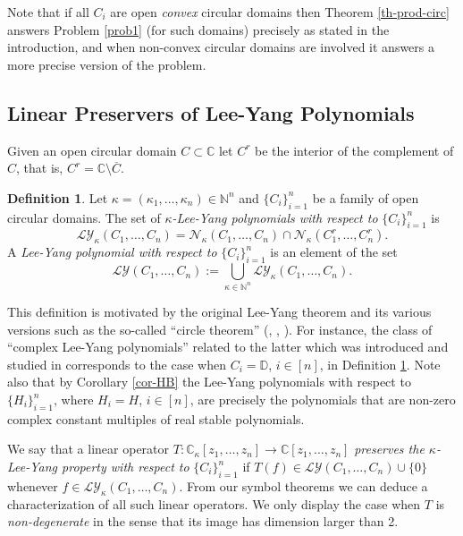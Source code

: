 \documentclass[10pt,reqno]{amsart}
\theoremstyle{plain}
\theoremstyle{definition}
\newtheorem{definition}{Definition}[section]
\theoremstyle{remark}
\numberwithin{equation}{section}
\newcommand{\NN}{\mathbb{N}}
\newcommand{\NV}{\mathcal{N}}
\newcommand{\LY}{\mathcal{LY}}
\newcommand{\CC}{\mathbb{C}}
\newcommand{\DD}{\mathbb{D}}
\begin{document}
Note that if all $C_i$ are open {\em convex} circular domains then  
Theorem \ref{th-prod-circ} answers Problem \ref{prob1} (for such domains) 
precisely as stated in the introduction, and when non-convex circular
 domains are involved 
it answers a more precise version of the problem. 


\subsection{Linear Preservers of Lee-Yang Polynomials}\label{s-LY} 
Given an open circular domain $C\subset \CC$ let $C^r$ be the interior 
of the complement of 
$C$, that is, $C^r=\CC\setminus \overline{C}$. 

\begin{definition}\label{d-ly}
Let $\kappa=(\kappa_1,\ldots,\kappa_n)\in\NN^n$ and  
$\{C_i\}_{i=1}^n$ be a family of open circular domains. The set of 
{\em $\kappa$-Lee-Yang polynomials with respect to} 
$\{C_i\}_{i=1}^{n}$ is 
$$
\LY_\kappa(C_1,\ldots,C_n)=\NV_\kappa(C_1,\ldots,C_n)\cap 
\NV_\kappa(C_1^r,\ldots,C_n^r).
$$ 
A {\em Lee-Yang polynomial  
with respect to} $\{C_i\}_{i=1}^{n}$ is an element of the set
$$
\LY(C_1,\ldots,C_n):=\bigcup_{\kappa\in\NN^n}
\LY_\kappa(C_1,\ldots,C_n).
$$
\end{definition} 

This definition is motivated by the original 
Lee-Yang theorem \cite{LY}  and its various 
versions such as the so-called ``circle theorem'' 
(\cite[Theorem 8.4]{BB-II}, \cite{hink}, \cite{ruelle5}). For instance,  
the class of 
``complex Lee-Yang polynomials'' related to the latter which 
was introduced and studied in \cite{beau} corresponds to the case when 
$C_i=\DD$, $i\in [n]$, in Definition \ref{d-ly}. Note also that 
by Corollary \ref{cor-HB} the Lee-Yang polynomials with respect 
to $\{H_i\}_{i=1}^n$, where $H_i=H$, $i\in [n]$, are precisely the polynomials 
that are non-zero complex constant multiples of real stable polynomials. 
 
We say that a linear operator $T : \CC_\kappa[z_1,\ldots, z_n] \rightarrow 
\CC[z_1,\ldots, z_n]$ {\em preserves the $\kappa$-Lee-Yang property with 
respect to} $\{C_i\}_{i=1}^{n}$ 
if $T(f)\in\LY(C_1,\ldots,C_n)\cup \{0\}$ whenever 
$f\in \LY_\kappa(C_1,\ldots,C_n)$. From our symbol theorems we 
can deduce a characterization of all such linear operators. We only display 
the case when $T$ is {\em non-degenerate} in the sense that its image has 
dimension larger than 2. 
\end{document}
